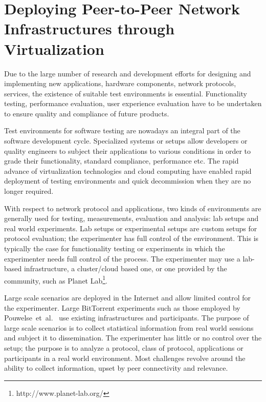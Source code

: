 
\chapter{Deploying Peer-to-Peer Network Infrastructures through
Virtualization}
\label{chapter:virt-infra}

Due to the large number of research and development efforts for designing and
implementing new applications, hardware components, network protocols,
services, the existence of suitable test environments is essential.
Functionality testing, performance evaluation, user experience evaluation have
to be undertaken to ensure quality and compliance of future products.

Test environments for software testing are nowadays an integral part of the
software development cycle. Specialized systems or setups allow developers or
quality engineers to subject their applications to various conditions in order
to grade their functionality, standard compliance, performance etc. The rapid
advance of virtualization technologies and cloud computing have enabled rapid
deployment of testing environments and quick decommission when they are no
longer required.

With respect to network protocol and applications, two kinds of environments
are generally used for testing, measurements, evaluation and analysis: lab
setups and real world experiments. Lab setups or experimental setups are
custom setups for protocol evaluation; the experimenter has full control of
the environment. This is typically the case for functionality testing or
experiments in which the experimenter needs full control of the process. The
experimenter may use a lab-based infrastructure, a cluster/cloud based one, or
one provided by the community, such as Planet
Lab\footnote{http://www.planet-lab.org/}.

Large scale scenarios are deployed in the Internet and allow limited control
for the experimenter. Large BitTorrent experiments such as those employed by
Pouwelse~et~al.~\cite{measurement-study} use existing infrastructures and
participants. The purpose of large scale scenarios is to collect statistical
information from real world sessions and subject it to dissemination. The
experimenter has little or no control over the setup; the purpose is to
analyze a protocol, class of protocol, applications or participants in a real
world environment. Most challenges revolve around the ability to collect
information, upset by peer connectivity and relevance.

